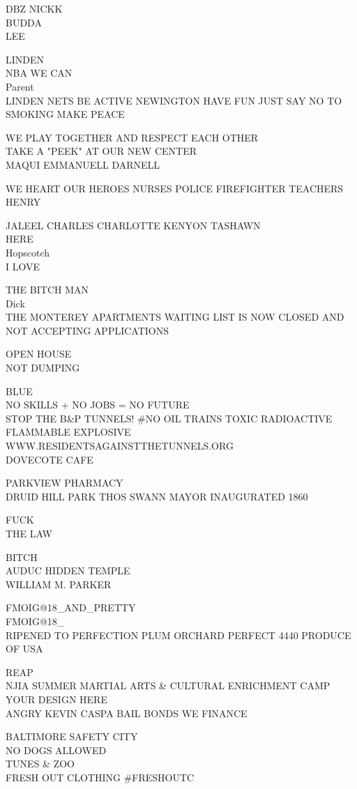 \documentclass[10pt,letterpaper]{article}
\begin{document}
DBZ NICKK\\
BUDDA\\
LEE

LINDEN\\
NBA WE CAN\\
Parent\\
LINDEN NETS BE ACTIVE NEWINGTON HAVE FUN JUST SAY NO TO SMOKING MAKE PEACE

WE PLAY TOGETHER AND RESPECT EACH OTHER\\
TAKE A "PEEK" AT OUR NEW CENTER\\
MAQUI EMMANUELL DARNELL

WE HEART OUR HEROES NURSES POLICE FIREFIGHTER TEACHERS\\
HENRY

JALEEL CHARLES CHARLOTTE KENYON TASHAWN\\
HERE\\
Hopscotch\\
I LOVE

THE BITCH MAN\\
Dick\\
THE MONTEREY APARTMENTS WAITING LIST IS NOW CLOSED AND NOT ACCEPTING APPLICATIONS

OPEN HOUSE\\
NOT DUMPING

BLUE\\
NO SKILLS + NO JOBS = NO FUTURE\\
STOP THE B\&P TUNNELS!  \#NO OIL TRAINS TOXIC RADIOACTIVE FLAMMABLE EXPLOSIVE WWW.RESIDENTSAGAINSTTHETUNNELS.ORG\\
DOVECOTE CAFE

PARKVIEW PHARMACY\\
DRUID HILL PARK THOS SWANN MAYOR INAUGURATED 1860

FUCK\\
THE LAW

BITCH\\
AUDUC HIDDEN TEMPLE\\
WILLIAM M. PARKER

FMOIG@18\_AND\_PRETTY\\
FMOIG@18\_\\
RIPENED TO PERFECTION PLUM ORCHARD PERFECT 4440 PRODUCE OF USA

REAP\\
NJIA SUMMER MARTIAL ARTS \& CULTURAL ENRICHMENT CAMP\\
YOUR DESIGN HERE\\
ANGRY KEVIN CASPA BAIL BONDS WE FINANCE

BALTIMORE SAFETY CITY\\
NO DOGS ALLOWED\\
TUNES \& ZOO\\
FRESH OUT CLOTHING \#FRESHOUTC
\end{document}
